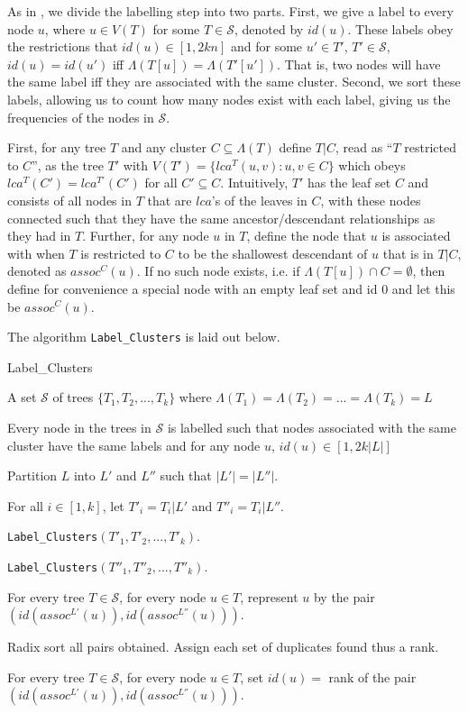 \documentclass{article}
\newcommand{\leafset}{\Lambda}
\begin{document}
    As in \cite{gawrychowski2017faster}, we divide the labelling step into two parts. First, we give a label to every node $u$, where $u \in V(T)$ for some $T \in \mathcal{S}$, denoted by $id(u)$. These labels obey the restrictions that $id(u) \in [1, 2kn]$ and for some $u' \in T'$, $T' \in \mathcal{S}$, $id(u) = id(u')$ iff $\leafset(T[u]) = \leafset(T'[u'])$. That is, two nodes will have the same label iff they are associated with the same cluster. Second, we sort these labels, allowing us to count how many nodes exist with each label, giving us the frequencies of the nodes in $\mathcal{S}$.

    First, for any tree $T$ and any cluster $C \subseteq \leafset(T)$ define $T|C$, read as ``$T$ restricted to $C$'', as the tree $T'$ with $V(T') = \{lca^T(u, v) : u, v \in C\}$ which obeys $lca^T(C') = lca^{T'}(C')$ for all $C' \subseteq C$. Intuitively, $T'$ has the leaf set $C$ and consists of all nodes in $T$ that are $lca$'s of the leaves in $C$, with these nodes connected such that they have the same ancestor/descendant relationships as they had in $T$. Further, for any node $u$ in $T$, define the node that $u$ is associated with when $T$ is restricted to $C$ to be the shallowest descendant of $u$ that is in $T|C$, denoted as $assoc^{C}(u)$. If no such node exists, i.e. if $\leafset(T[u]) \cap C = \emptyset$, then define for convenience a special node with an empty leaf set and id $0$ and let this be $assoc^{C}(u)$.

    The algorithm \texttt{Label\_Clusters} is laid out below.

    \begin{algorithm}
        \caption{Label\_Clusters}
        \label{alg:labelclusters}

        \begin{algorithmic}[1]
            \Input A set $\mathcal{S}$ of trees $\{T_1, T_2, ..., T_k\}$ where $\leafset(T_1) = \leafset(T_2) = ... = \leafset(T_k) = L$

            \Output Every node in the trees in $\mathcal{S}$ is labelled such that nodes associated with the same cluster have the same labels and for any node $u$, $id(u) \in [1, 2k |L|]$

            \State Partition $L$ into $L'$ and $L''$ such that $|L'| = |L''|$.

            \State For all $i \in [1,k]$, let $T'_i = T_i|L'$ and $T''_i = T_i|L''$.

            \State \texttt{Label\_Clusters}$(T'_1, T'_2, ..., T'_k)$.

            \State \texttt{Label\_Clusters}$(T''_1, T''_2, ..., T''_k)$.

            \State For every tree $T \in \mathcal{S}$, for every node $u \in T$, represent $u$ by the pair $(id(assoc^{L'}(u)), id(assoc^{L''}(u)))$.

            \State Radix sort all pairs obtained. Assign each set of duplicates found thus a rank.

            \State For every tree $T \in \mathcal{S}$, for every node $u \in T$, set $id(u) = $ rank of the pair $(id(assoc^{L'}(u)), id(assoc^{L''}(u)))$.
        \end{algorithmic}
    \end{algorithm}
\end{document}
